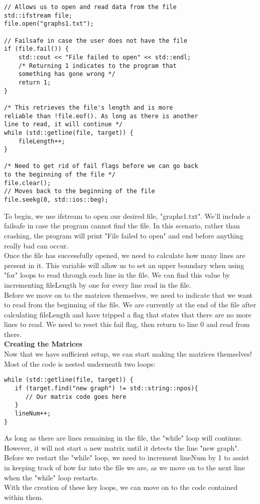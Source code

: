\documentclass{article}
\begin{document}
\begin{lstlisting}
// Allows us to open and read data from the file
std::ifstream file;
file.open("graphs1.txt");

// Failsafe in case the user does not have the file
if (file.fail()) {
    std::cout << "File failed to open" << std::endl;
    /* Returning 1 indicates to the program that 
    something has gone wrong */
    return 1;
}

/* This retrieves the file's length and is more 
reliable than !file.eof(). As long as there is another 
line to read, it will continue */
while (std::getline(file, target)) {
    fileLength++;
}

/* Need to get rid of fail flags before we can go back 
to the beginning of the file */
file.clear();
// Moves back to the beginning of the file
file.seekg(0, std::ios::beg);
\end{lstlisting}
To begin, we use ifstream to open our desired file, "graphs1.txt". We'll include a failsafe in case the program cannot find the file. In this scenario, rather than crashing, the program will print "File failed to open" and end before anything really bad can occur. \\
Once the file has successfully opened, we need to calculate how many lines are present in it. This variable will allow us to set an upper boundary when using "for" loops to read through each line in the file. We can find this value by incrementing fileLength by one for every line read in the file. \\
Before we move on to the matrices themselves, we need to indicate that we want to read from the beginning of the file. We are currently at the end of the file after calculating fileLength and have tripped a flag that states that there are no more lines to read. We need to reset this fail flag, then return to line 0 and read from there. \\

\textbf{Creating the Matrices} \\
Now that we have sufficient setup, we can start making the matrices themselves! Most of the code is nested underneath two loops:

\begin{lstlisting}
while (std::getline(file, target)) {
   if (target.find("new graph") != std::string::npos){
      // Our matrix code goes here
   }
   lineNum++;
}
\end{lstlisting}
As long as there are lines remaining in the file, the "while" loop will continue. However, it will not start a new matrix until it detects the line "new graph". Before we restart the "while" loop, we need to increment lineNum by 1 to assist in keeping track of how far into the file we are, as we move on to the next line when the "while" loop restarts. \\
With the creation of these key loops, we can move on to the code contained within them. \pagebreak
\end{document}
